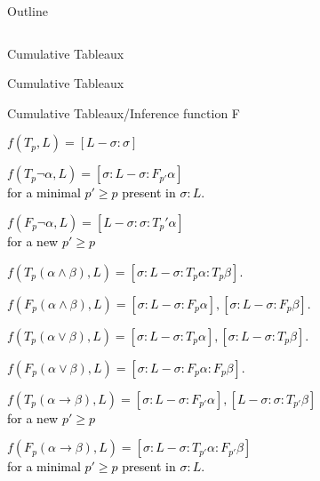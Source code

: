 \documentclass{beamer}
\begin{document}
\begin{frame}{Outline}
\begin{columns}
\begin{itemize}
\begin{itemize}
            \end{itemize}
        \end{itemize}
    \end{columns}
\end{frame}

\begin{frame}{Cumulative Tableaux}
    \tableauxCumulativeAndNonCumulativeExampleFigure
\end{frame}


\begin{frame}{Cumulative Tableaux}
    \tableauxCumulativeAndNonCumulativeExampleFigureClassical
\end{frame}






\begin{frame}{Cumulative Tableaux/Inference function F}
    \scriptsize{
    \begin{itemize}

        \item\textcolor{black}{ $f(T_{p} ,L) = [L - \sigma: \sigma ] $ 
        \item $f(T_{p} \neg \alpha,L) = [\sigma :L - \sigma: F_{p'}\alpha] $ \\for a minimal $p' \geq p$ present in $\sigma:L$.
        \textcolor{black}{\item $f(F_{p} \neg \alpha,L) = [L - \sigma : \sigma : T_p' \alpha]$  \\for a new $p' \geq p$}
        \item $f(T_{p} (\alpha \land \beta), L) = [\sigma :L - \sigma: T_{p} \alpha : T_{p} \beta]$.
        \item $f(F_{p} (\alpha \land \beta), L) = [\sigma :L - \sigma: F_{p} \alpha],[ \sigma :L - \sigma: F_{p} \beta]$.
        \textcolor{black}{\item $f(T_{p} (\alpha \lor \beta), L) = [\sigma :L - \sigma: T_{p} \alpha],[ \sigma :L - \sigma: T_{p} \beta]$.}
        \item $f(F_{p} (\alpha \lor \beta), L) = [\sigma :L - \sigma: F_{p} \alpha : F_{p} \beta]$.
        \item $f(T_{p} (\alpha \to \beta), L) = [\sigma :L - \sigma: F_{p'} \alpha],[ L - \sigma : \sigma : T_{p'} \beta]$ \\for a new $p' \geq p$ 
        \item $f(F_{p} (\alpha \to \beta), L) = [\sigma :L - \sigma: T_{p'} \alpha : F_{p'} \beta]$ \\for a minimal $p' \geq p$ present in $\sigma:L$.}
    \end{itemize} 
    }
\end{frame}
\end{document}
